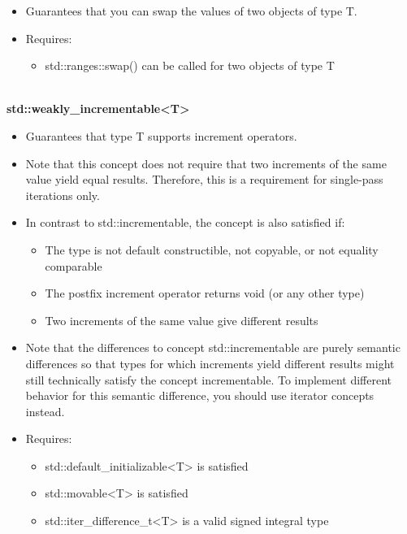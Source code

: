 \begin{itemize}
\item
Guarantees that you can swap the values of two objects of type T.

\item
Requires:
\begin{itemize}
\item
std::ranges::swap() can be called for two objects of type T
\end{itemize}
\end{itemize}


\noindent
\hspace*{\fill} \\ %
\textbf{std::weakly\_incrementable<T>}

\begin{itemize}
\item
Guarantees that type T supports increment operators.

\item
Note that this concept does not require that two increments of the same value yield equal results. Therefore, this is a requirement for single-pass iterations only.

\item
In contrast to std::incrementable, the concept is also satisfied if:

\begin{itemize}
\item
The type is not default constructible, not copyable, or not equality comparable

\item
The postfix increment operator returns void (or any other type)

\item
Two increments of the same value give different results
\end{itemize}

\item
Note that the differences to concept std::incrementable are purely semantic differences so that types for which increments yield different results might still technically satisfy the concept incrementable. To implement different behavior for this semantic difference, you should use iterator concepts instead.

\item
Requires:
\begin{itemize}
\item
std::default\_initializable<T> is satisfied

\item
std::movable<T> is satisfied

\item
std::iter\_difference\_t<T> is a valid signed integral type
\end{itemize}
\end{itemize}



